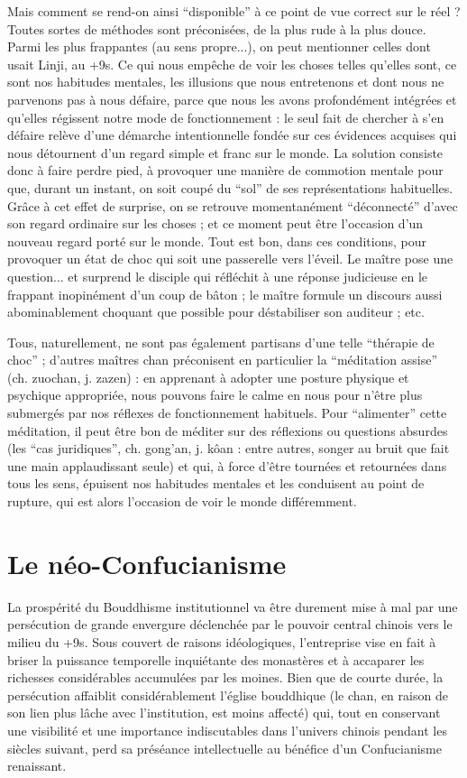 Mais comment se rend-on ainsi ``disponible'' à ce point de vue correct sur le réel ?
Toutes sortes de méthodes sont préconisées, de la plus rude à la plus douce.
Parmi les
plus frappantes (au sens propre...), on peut mentionner celles dont usait Linji, au +9s.
Ce qui nous empêche de voir les choses telles qu'elles sont, ce sont nos habitudes
mentales, les illusions que nous entretenons et dont nous ne parvenons pas à nous défaire, parce que nous les avons profondément intégrées et qu'elles régissent notre mode
de fonctionnement : le seul fait de chercher à s'en défaire relève d'une démarche intentionnelle fondée sur ces évidences acquises qui nous détournent d'un regard simple et
franc sur le monde.
La solution consiste donc à faire perdre pied, à provoquer une manière de commotion mentale pour que, durant un instant, on soit coupé du ``sol'' de ses
représentations habituelles.
Grâce à cet effet de surprise, on se retrouve momentanément
``déconnecté'' d'avec son regard ordinaire sur les choses ; et ce moment peut être
l'occasion d'un nouveau regard porté sur le monde.
Tout est bon, dans ces conditions,
pour provoquer un état de choc qui soit une passerelle vers l'éveil.
Le maître pose une
question...
et surprend le disciple qui réfléchit à une réponse judicieuse en le frappant
inopinément d'un coup de bâton ; le maître formule un discours aussi abominablement
choquant que possible pour déstabiliser son auditeur ; etc.

Tous, naturellement, ne sont pas également partisans d'une telle ``thérapie de choc'' ;
d'autres maîtres chan préconisent en particulier la ``méditation assise'' (ch. zuochan, j.
zazen) : en apprenant à adopter une posture physique et psychique appropriée, nous
pouvons faire le calme en nous pour n'être plus submergés par nos réflexes de fonctionnement habituels.
Pour ``alimenter'' cette méditation, il peut être bon de méditer sur
des réflexions ou questions absurdes (les ``cas juridiques'', ch. gong'an, j. kôan : entre
autres, songer au bruit que fait une main applaudissant seule) et qui, à force d'être tournées et retournées dans tous les sens, épuisent nos habitudes mentales et les conduisent
au point de rupture, qui est alors l'occasion de voir le monde différemment.
\section{Le néo-Confucianisme}
La prospérité du Bouddhisme institutionnel va être durement mise à mal par une persécution de grande envergure déclenchée par le pouvoir central chinois vers le milieu du +9s.
Sous couvert de raisons idéologiques, l'entreprise vise en fait à briser la
puissance temporelle inquiétante des monastères et à accaparer les richesses considérables accumulées par les moines.
Bien que de courte durée, la persécution affaiblit
considérablement l'église bouddhique (le chan, en raison de son lien plus lâche avec
l'institution, est moins affecté) qui, tout en conservant une visibilité et une importance
indiscutables dans l'univers chinois pendant les siècles suivant, perd sa préséance intellectuelle au bénéfice d'un Confucianisme renaissant.

